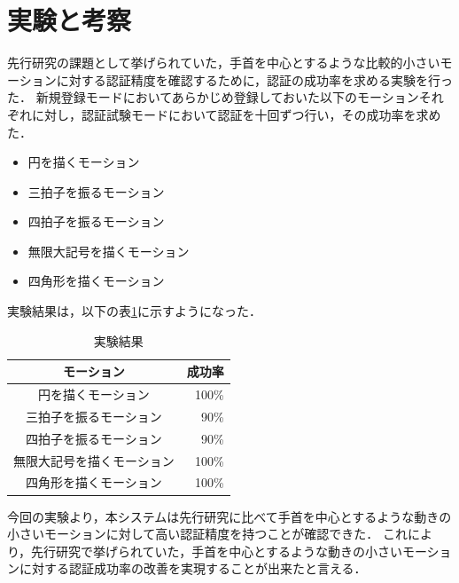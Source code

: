 \documentclass[11pt]{jarticle}
\begin{document}
\section{実験と考察}
先行研究の課題として挙げられていた，手首を中心とするような比較的小さいモーションに対する認証精度を確認するために，認証の成功率を求める実験を行った．
新規登録モードにおいてあらかじめ登録しておいた以下のモーションそれぞれに対し，認証試験モードにおいて認証を十回ずつ行い，その成功率を求めた．

\begin{itemize}
    \item 円を描くモーション
    \item 三拍子を振るモーション
    \item 四拍子を振るモーション
    \item 無限大記号を描くモーション
    \item 四角形を描くモーション
\end{itemize}

実験結果は，以下の表\ref{result}に示すようになった．

\begin{table}[htb]
    \begin{center}
        \caption{実験結果}
        \label{result}
        \begin{tabular}{|c|r|} \hline
            モーション & 成功率 \\ \hline \hline
            円を描くモーション & 100\% \\ \hline
            三拍子を振るモーション & 90\% \\ \hline
            四拍子を振るモーション & 90\% \\ \hline
            無限大記号を描くモーション & 100\% \\ \hline
            四角形を描くモーション & 100\% \\ \hline
        \end{tabular}
    \end{center}
\end{table}

今回の実験より，本システムは先行研究に比べて手首を中心とするような動きの小さいモーションに対して高い認証精度を持つことが確認できた．
これにより，先行研究で挙げられていた，手首を中心とするような動きの小さいモーションに対する認証成功率の改善を実現することが出来たと言える．
\end{document}
